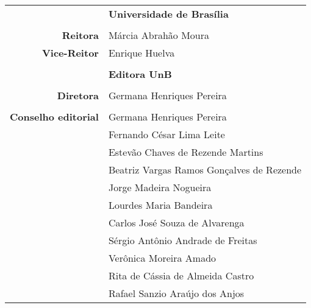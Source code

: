 \thispagestyle{empty}

\begin{center}

\begin{tabular}{r:l}
						& \textbf{\Large Universidade de Brasília}				\\
						&														\\
	{\bf Reitora} 		& Márcia Abrahão Moura									\\
	{\bf Vice-Reitor}	& Enrique Huelva										\\
						&														\\
						& \textbf{\Large Editora UnB}							\\
						&														\\
	{\bf Diretora}		& Germana Henriques Pereira								\\
						&														\\
	{\bf Conselho editorial}	&	Germana Henriques Pereira					\\
								&	Fernando César Lima Leite					\\
								&	Estevão Chaves de Rezende Martins			\\
								&	Beatriz Vargas Ramos Gonçalves de Rezende	\\
								&	Jorge Madeira Nogueira						\\
								&	Lourdes Maria Bandeira						\\
								&	Carlos José Souza de Alvarenga				\\
								&	Sérgio Antônio Andrade de Freitas			\\
								&	Verônica Moreira Amado						\\
								&	Rita de Cássia de Almeida Castro			\\
								&	Rafael Sanzio Araújo dos Anjos				\\
\end{tabular}

\end{center}

\clearpage
